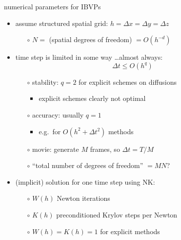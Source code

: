 \documentclass[hide notes,intlimits,usenames,dvipsnames]{beamer}
\begin{document}
\begin{frame}{numerical parameters for IBVPs}

\begin{itemize}
\item assume structured spatial grid: $h=\Delta x = \Delta y=\Delta z$
    \begin{itemize}
    \item[$\circ$] $N=$ (spatial degrees of freedom) $=O(h^{-d})$
    \end{itemize}
\item time step is limited in some way \dots almost always:
    $$\Delta t \le O(h^q)$$
    \vspace{-5mm}
    \begin{itemize}
    \item[$\circ$] stability: $q=2$ for explicit schemes on diffusions
	    \begin{itemize}
	    \item explicit schemes clearly not optimal
	    \end{itemize}
    \item[$\circ$] accuracy: usually $q=1$
	    \begin{itemize}
	    \item e.g.~for $O(h^2+\Delta t^2)$ methods
	    \end{itemize}
    \item[$\circ$] movie: generate $M$ frames, so $\Delta t = T/M$
    \item[$\circ$] ``total number of degrees of freedom'' $=M N$?
    \end{itemize}
\item (implicit) solution for one time step using NK:
    \begin{itemize}
    \item[$\circ$] $W(h)$ Newton iterations
    \item[$\circ$] $K(h)$ preconditioned Krylov steps per Newton
    \item[$\circ$] $W(h)=K(h)=1$ for explicit methods
    \end{itemize}
\end{itemize}
\end{frame}
\end{document}
